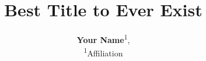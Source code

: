 \documentclass{article}
\title{Best Title to Ever Exist}
\author{%
      \textbf{Your Name}\textsuperscript{1}, \\
      \textsuperscript{1}Affiliation \quad
}
\begin{document}
\maketitle

   










{
    \small
    
    
}


\appendix

\renewcommand{\thesection}{\Alph{section}}          %
\renewcommand{\thefigure}{\Alph{section}\arabic{figure}} %
\renewcommand{\thetable}{\Alph{section}\arabic{table}}   %

\setcounter{section}{0}


\clearpage
% 
% 
% 
% 
% 
\end{document}
